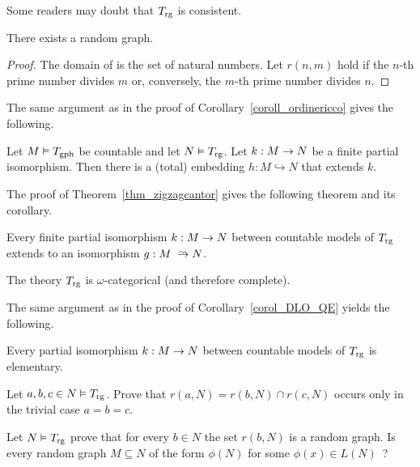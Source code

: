 Some readers may doubt that $T_{\rm rg}$ is consistent.

\begin{proposition}
There exists a random graph.
\end{proposition}
\begin{proof}
The domain of is the set of natural numbers.
Let $r(n,m)$ hold if the $n$-th prime number divides $m$ or, conversely, the $m$-th prime number divides $n$.
\end{proof}

The same argument as in the proof of Corollary~\ref{coroll_ordinericco} gives the following.

\begin{corollary}\label{coroll_graforicco}
Let $M\models T_{\rm gph}$ be countable and let $N\models T_{\rm rg}$.
Let $k:M\imp N$ be a finite partial isomorphism.
Then there is a (total) embedding $h:M\hookrightarrow N$ that extends $k$.
\end{corollary}

The proof of Theorem~\ref{thm_zigzagcantor} gives the following theorem and its corollary.

\begin{theorem}\label{gaomegacat}
Every finite partial isomorphism $k:M\imp N$ between countable models of $T_{\rm rg}$ extends to an isomorphism $g:M\isomap N$.
\end{theorem}

\begin{corollary}\label{corol_RG_omegacat}
The theory $T_{\rm rg}$ is $\omega$-categorical (and therefore complete).
\end{corollary}

The same argument as in the proof of Corollary~\ref{corol_DLO_QE} yields the following.

\begin{corollary}\label{corol_RG_QE}
  Every partial isomorphism $k:M\imp N$ between countable models of $T_{\rm rg}$ is elementary.
\end{corollary}

\begin{exercise}
Let $a,b,c\in N\models T_{\rm rg}$.
Prove that $r(a,N)=r(b,N)\cap r(c,N)$ occurs only in the trivial case $a=b=c$.
\end{exercise}

\begin{exercise}\label{ex_r(b,N)}
Let $N\models T_{\rm rg}$ prove that for every $b\in N$ the set $r(b,N)$ is a random graph.
Is every random graph $M\subseteq N$ of the form $\phi(N)$ for some $\phi(x)\in L(N)$~?
\end{exercise}

